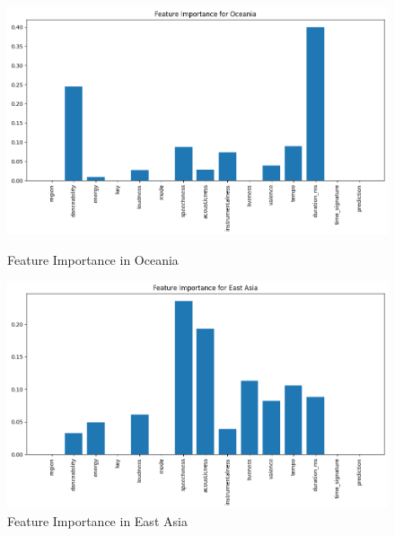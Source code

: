 \begin{figure}[h]
    \centering
    \begin{minipage}{0.45\textwidth}
        \centering
        \includegraphics[width=\linewidth]{media/dt_feat_imp_oce.png}
        \caption{Feature Importance in Oceania}
    \end{minipage}%
    \hspace{0.05\textwidth} %
    \begin{minipage}{0.45\textwidth}
        \centering
        \includegraphics[width=\linewidth]{media/dt_feat_imp_east_asia.png}
        \caption{Feature Importance in East Asia}
    \end{minipage}
\end{figure}

